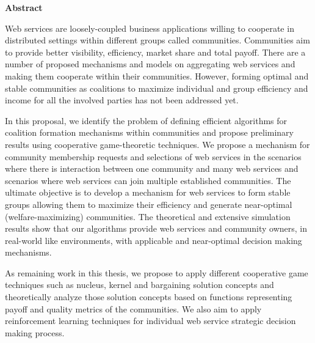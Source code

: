 \begin{center}
{\LARGE\textbf{Abstract}}
\end{center}

Web services are loosely-coupled business applications willing to
cooperate in distributed settings within different groups called
communities. Communities aim to provide better visibility,
efficiency, market share and total payoff. There are a number of
proposed mechanisms and models on aggregating web services and
making them cooperate within their communities. However, forming
optimal and stable communities as coalitions to maximize
individual and group efficiency and income for all the involved
parties has not been addressed yet.

In this proposal, we identify the problem of defining efficient
algorithms for coalition formation mechanisms within communities
and propose preliminary results using cooperative game-theoretic
techniques. We propose a mechanism for community membership
requests and selections of web services in the scenarios where
there is interaction between one community and many web services
and scenarios where web services can join multiple established
communities. The ultimate objective is to develop a mechanism for
web services to form stable groups allowing them to maximize their
efficiency and generate near-optimal (welfare-maximizing)
communities. The theoretical and extensive simulation results show
that our algorithms provide web services and community owners, in
real-world like environments, with applicable and near-optimal
decision making mechanisms.

As remaining work in this thesis, we propose to apply different
cooperative game techniques such as nucleus, kernel and bargaining
solution concepts and theoretically analyze those solution
concepts based on functions representing payoff and quality
metrics of the communities. We also aim to apply reinforcement
learning techniques for individual web service strategic decision
making process.






















